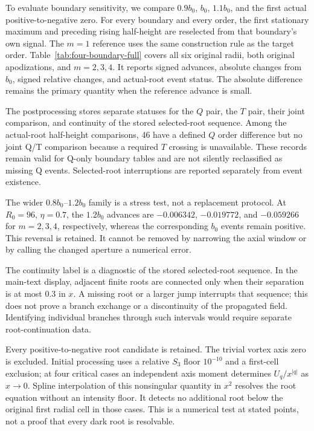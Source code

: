 To evaluate boundary sensitivity, we compare $0.9b_0$, $b_0$, $1.1b_0$,
and the first actual positive-to-negative zero. For every boundary and every
order, the first stationary maximum and preceding rising half-height are
reselected from that boundary's own signal. The $m=1$ reference uses the
same construction rule as the target order. Table~\ref{tab:four-boundary-full}
covers all six original radii, both original apodizations, and $m=2,3,4$.
It reports signed advances, absolute changes from $b_0$, signed relative
changes, and actual-root event status. The absolute difference remains the
primary quantity when the reference advance is small.

The postprocessing stores separate statuses for the $Q$ pair, the $T$ pair,
their joint comparison, and continuity of the stored selected-root sequence. Among the
actual-root half-height comparisons, 46 have a defined $Q$ order difference
but no joint Q/T comparison because a required $T$ crossing is unavailable.
These records remain valid for Q-only boundary tables and are not silently
reclassified as missing Q events. Selected-root interruptions are reported separately
from event existence.

The wider $0.8b_0$--$1.2b_0$ family is a stress test, not a replacement
protocol. At $R_0=96$, $\eta=0.7$, the $1.2b_0$ advances are
$-0.006342$, $-0.019772$, and $-0.059266$ for $m=2,3,4$, respectively,
whereas the corresponding $b_0$ events remain positive. This reversal is
retained. It cannot be removed by narrowing the axial window or by calling
the changed aperture a numerical error.

The continuity label is a diagnostic of the stored selected-root sequence.
In the main-text display, adjacent finite roots are connected only when their
separation is at most 0.3 in $x$. A missing root or a larger jump interrupts
that sequence; this does not prove a branch exchange or a discontinuity of
the propagated field. Identifying individual branches through such intervals
would require separate root-continuation data.



Every positive-to-negative root candidate is retained. The trivial vortex
axis zero is excluded. Initial processing uses a relative $S_3$ floor
$10^{-10}$ and a first-cell exclusion; at four critical cases an
independent axis moment determines $U_q/x^{|q|}$ as $x\to0$.
Spline interpolation of this nonsingular quantity in $x^2$ resolves the
root equation without an intensity floor. It detects no additional root
below the original first radial cell in those cases. This is a numerical
test at stated points, not a proof that every dark root is resolvable.

